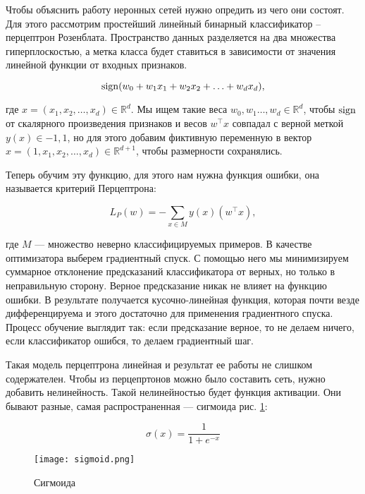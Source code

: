 Чтобы объяснить работу неронных сетей нужно опредить из чего они состоят. Для этого рассмотрим простейший линейный бинарный классификатор -- перцептрон Розенблата. Пространство данных разделяется на два множества гиперплоскостью, а метка класса будет ставиться в зависимости от значения линейной функции от входных признаков.

\begin{equation}
 \operatorname*{sign} (w_0 + w_1x_1 + w_2x_2 + \ldots + w_dx_d),
\end{equation}

где $x =(x_1, x_2, \ldots, x_d) \in \mathds{R}^d$. Мы ищем такие веса $w_0, w_1 \ldots, w_d \in \mathds{R}^d$,
чтобы $\operatorname*{sign}$ от скалярного произведения признаков и весов $w^\top x$ совпадал с верной меткой $y(x) \in
{-1,1}$, но для этого добавим фиктивную переменную в вектор $x =(1, x_1, x_2, \ldots, x_d) \in
\mathds{R}^{d+1}$, чтобы размерности сохранялись.

\bigskip
Теперь обучим эту функцию, для этого нам нужна функция ошибки, она называется критерий Перцептрона:

\begin{equation}
 L_P(w) = - \sum_{x \in M} y(x)(w^\top x),
\end{equation}

где $M$ --- множество неверно классифицируемых примеров. В качестве оптимизатора выберем градиентный спуск. С
помощью него мы минимизируем суммарное отклонение предсказаний классификатора от верных, но только в
неправильную сторону. Верное предсказание никак не влияет на функцию ошибки. В результате получается
кусочно-линейная функция, которая почти везде дифференцируема и этого достаточно для применения градиентного
спуска. Процесс обучение выглядит так: если предсказание верное, то не делаем ничего, если классификатор
ошибся, то делаем градиентный шаг.

Такая модель перцептрона линейная и результат ее работы не слишком содержателен. Чтобы из перцепртонов можно
было составить сеть, нужно добавить нелинейность. Такой нелинейностью будет функция активации. Они бывают
разные, самая распространенная --- сигмоида рис. \ref{fig:sigmoid}:

\begin{equation} \label{eq:sigma}
    \sigma (x) = \frac{1}{1+e^{-x}}
\end{equation}

\begin{figure}[ht]
    \centering
    \texttt{[image: sigmoid.png]}
    \caption{Сигмоида}
    \label{fig:sigmoid}
\end{figure}

